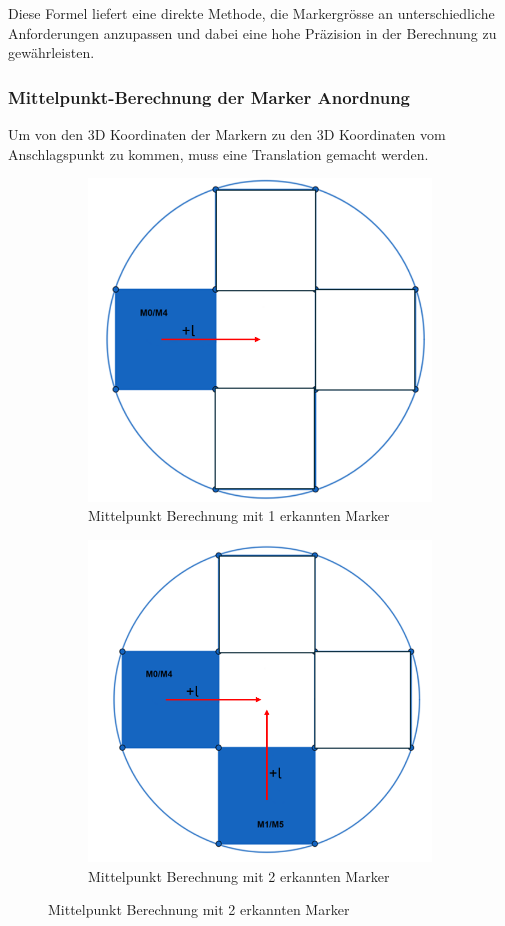 Diese Formel liefert eine direkte Methode, die Markergrösse an unterschiedliche Anforderungen anzupassen und dabei eine hohe Präzision in der Berechnung zu gewährleisten.


\subsubsection{Mittelpunkt-Berechnung der Marker Anordnung}
\label{sec:middlePoint}

Um von den 3D Koordinaten der Markern zu den 3D Koordinaten vom Anschlagspunkt zu kommen, muss eine Translation 
gemacht werden.

\begin{figure}[H]
    \centering
    \begin{subfigure}[h]{0.5\textwidth}
        \includegraphics[width=0.5\linewidth]{graphics/anordnung_marker_1.png}
        \caption{Mittelpunkt Berechnung mit 1 erkannten Marker}
        \label{fig:marker_anordnung1}
    \end{subfigure}
    \begin{subfigure}[h]{0.5\textwidth}
        \includegraphics[width=0.5\linewidth]{graphics/anordnung_marker_2.png}
        \caption{Mittelpunkt Berechnung mit 2 erkannten Marker}
        \label{fig:marker_anordnung2}
    \end{subfigure}

\end{figure}
